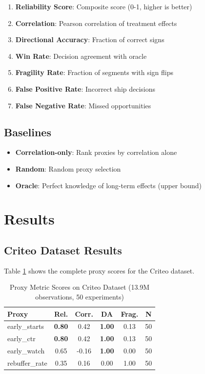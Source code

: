 \documentclass[11pt,twocolumn]{article}
\begin{document}
\begin{enumerate}
    \item \textbf{Reliability Score}: Composite score (0-1, higher is better)
    \item \textbf{Correlation}: Pearson correlation of treatment effects
    \item \textbf{Directional Accuracy}: Fraction of correct signs
    \item \textbf{Win Rate}: Decision agreement with oracle
    \item \textbf{Fragility Rate}: Fraction of segments with sign flips
    \item \textbf{False Positive Rate}: Incorrect ship decisions
    \item \textbf{False Negative Rate}: Missed opportunities
\end{enumerate}

\subsection{Baselines}

\begin{itemize}
    \item \textbf{Correlation-only}: Rank proxies by correlation alone
    \item \textbf{Random}: Random proxy selection
    \item \textbf{Oracle}: Perfect knowledge of long-term effects (upper bound)
\end{itemize}

\section{Results}

\subsection{Criteo Dataset Results}

Table \ref{tab:criteo_scores} shows the complete proxy scores for the Criteo dataset.

\begin{table}[H]
\centering
\caption{Proxy Metric Scores on Criteo Dataset (13.9M observations, 50 experiments)}
\label{tab:criteo_scores}
\small
\begin{tabular}{@{}lccccc@{}}
\toprule
\textbf{Proxy} & \textbf{Rel.} & \textbf{Corr.} & \textbf{DA} & \textbf{Frag.} & \textbf{N} \\
\midrule
early\_starts & \textbf{0.80} & 0.42 & \textbf{1.00} & 0.13 & 50 \\
early\_ctr & \textbf{0.80} & 0.42 & \textbf{1.00} & 0.13 & 50 \\
early\_watch & 0.65 & -0.16 & \textbf{1.00} & 0.00 & 50 \\
rebuffer\_rate & 0.35 & 0.16 & 0.00 & 1.00 & 50 \\
\bottomrule
\end{tabular}
\end{table}
\end{document}
